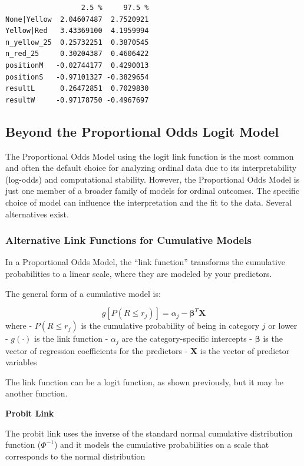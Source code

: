 \documentclass[
  letterpaper,
  DIV=11,
  numbers=noendperiod]{scrartcl}
\begin{document}
\begin{verbatim}
                  2.5 %     97.5 %
None|Yellow  2.04607487  2.7520921
Yellow|Red   3.43369100  4.1959994
n_yellow_25  0.25732251  0.3870545
n_red_25     0.30204387  0.4606422
positionM   -0.02744177  0.4290013
positionS   -0.97101327 -0.3829654
resultL      0.26472851  0.7029830
resultW     -0.97178750 -0.4967697
\end{verbatim}

\hypertarget{beyond-the-proportional-odds-logit-model}{%
\subsection{Beyond the Proportional Odds Logit
Model}\label{beyond-the-proportional-odds-logit-model}}

The Proportional Odds Model using the logit link function is the most
common and often the default choice for analyzing ordinal data due to
its interpretability (log-odds) and computational stability. However,
the Proportional Odds Model is just one member of a broader family of
models for ordinal outcomes. The specific choice of model can influence
the interpretation and the fit to the data. Several alternatives exist.

\hypertarget{alternative-link-functions-for-cumulative-models}{%
\subsubsection{Alternative Link Functions for Cumulative
Models}\label{alternative-link-functions-for-cumulative-models}}

In a Proportional Odds Model, the ``link function'' transforms the
cumulative probabilities to a linear scale, where they are modeled by
your predictors.

The general form of a cumulative model is:

\[
g[P(R \leq r_j)] = \alpha_j - \boldsymbol{\beta}^T\boldsymbol{X}
\] where - \(P(R \leq r_j)\) is the cumulative probability of being in
category \(j\) or lower - \(g(\cdot)\) is the link function -
\(\alpha_j\) are the category-specific intercepts -
\(\boldsymbol{\beta}\) is the vector of regression coefficients for the
predictors - \(\boldsymbol{X}\) is the vector of predictor variables

The link function can be a logit function, as shown previously, but it
may be another function.

\textbf{Probit Link}

The probit link uses the inverse of the standard normal cumulative
distribution function (\(\Phi^{-1}\)) and it models the cumulative
probabilities on a scale that corresponds to the normal distribution
\end{document}
